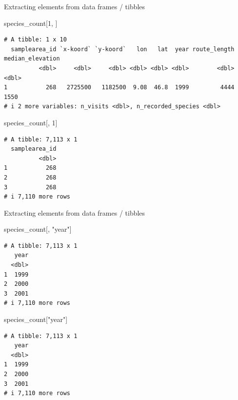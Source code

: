 \documentclass[
  ignorenonframetext,
  aspectratio=169,
]{beamer}
\newenvironment{Shaded}{\begin{snugshade}}{\end{snugshade}}
\newcommand{\DecValTok}[1]{\textcolor[rgb]{0.68,0.00,0.00}{#1}}
\newcommand{\NormalTok}[1]{\textcolor[rgb]{0.00,0.23,0.31}{#1}}
\newcommand{\StringTok}[1]{\textcolor[rgb]{0.13,0.47,0.30}{#1}}
\begin{document}
\begin{frame}[fragile]{Extracting elements from data frames / tibbles}
\protect{}\label{extracting-elements-from-data-frames-tibbles}
\footnotesize

\begin{Shaded}
\begin{Highlighting}[]
\NormalTok{species\_count[}\DecValTok{1}\NormalTok{, ]}
\end{Highlighting}
\end{Shaded}

\begin{verbatim}
# A tibble: 1 x 10
  samplearea_id `x-koord` `y-koord`   lon   lat  year route_length median_elevation
          <dbl>     <dbl>     <dbl> <dbl> <dbl> <dbl>        <dbl>            <dbl>
1           268   2725500   1182500  9.08  46.8  1999         4444             1550
# i 2 more variables: n_visits <dbl>, n_recorded_species <dbl>
\end{verbatim}

\begin{Shaded}
\begin{Highlighting}[]
\NormalTok{species\_count[, }\DecValTok{1}\NormalTok{]}
\end{Highlighting}
\end{Shaded}

\begin{verbatim}
# A tibble: 7,113 x 1
  samplearea_id
          <dbl>
1           268
2           268
3           268
# i 7,110 more rows
\end{verbatim}

\normalsize
\end{frame}

\begin{frame}[fragile]{Extracting elements from data frames / tibbles}
\protect{}\label{extracting-elements-from-data-frames-tibbles-1}
\footnotesize

\begin{Shaded}
\begin{Highlighting}[]
\NormalTok{species\_count[, }\StringTok{"year"}\NormalTok{]}
\end{Highlighting}
\end{Shaded}

\begin{verbatim}
# A tibble: 7,113 x 1
   year
  <dbl>
1  1999
2  2000
3  2001
# i 7,110 more rows
\end{verbatim}

\begin{Shaded}
\begin{Highlighting}[]
\NormalTok{species\_count[}\StringTok{"year"}\NormalTok{]}
\end{Highlighting}
\end{Shaded}

\begin{verbatim}
# A tibble: 7,113 x 1
   year
  <dbl>
1  1999
2  2000
3  2001
# i 7,110 more rows
\end{verbatim}

\normalsize
\end{frame}
\end{document}

